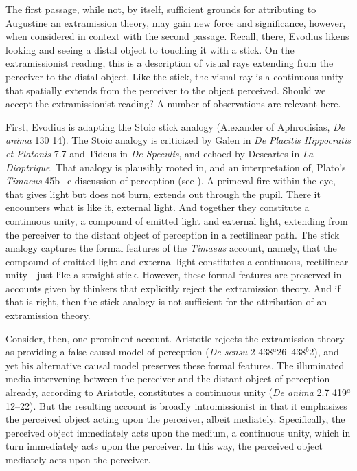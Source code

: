 \documentclass[12pt]{article}
\begin{document}
The first passage, while not, by itself, sufficient grounds for attributing to Augustine an extramission theory, may gain new force and significance, however, when considered in context with the second passage. Recall, there, Evodius likens looking and seeing a distal object to touching it with a stick. On the extramissionist reading, this is a description of visual rays extending from the perceiver to the distal object. Like the stick, the visual ray is a continuous unity that spatially extends from the perceiver to the object perceived. Should we accept the extramissionist reading? A number of observations are relevant here.

First, Evodius is adapting the Stoic stick analogy (Alexander of Aphrodisias, \emph{De anima} 130 14).  The Stoic analogy is criticized by Galen in \emph{De Placitis Hippocratis et Platonis} 7.7 and Tideus in \emph{De Speculis}, and echoed by Descartes in \emph{La Dioptrique}. That analogy is plausibly rooted in, and an interpretation of, Plato's \emph{Timaeus} 45b−c discussion of perception (see \citealt[chapter one]{Lindberg:1977aa}). A primeval fire within the eye, that gives light but does not burn, extends out through the pupil. There it encounters what is like it, external light. And together they constitute a continuous unity, a compound of emitted light and external light, extending from the perceiver to the distant object of perception in a rectilinear path. The stick analogy captures the formal features of the \emph{Timaeus} account, namely, that the compound of emitted light and external light constitutes a continuous, rectilinear unity---just like a straight stick. However, these formal features are preserved in accounts given by thinkers that explicitly reject the extramission theory. And if that is right, then the stick analogy is not sufficient for the attribution of an extramission theory. 

Consider, then, one prominent account. Aristotle rejects the extramission theory as providing a false causal model of perception (\emph{De sensu} 2 438\( ^{a} \)26--438\( ^{b} \)2), and yet his alternative causal model preserves these formal features. The illuminated media intervening between the perceiver and the distant object of perception already, according to Aristotle, constitutes a continuous unity (\emph{De anima} 2.7 419\( ^{a} \)12--22). But the resulting account is broadly intromissionist in that it emphasizes the perceived object acting upon the perceiver, albeit mediately. Specifically, the perceived object immediately acts upon the medium, a continuous unity, which in turn immediately acts upon the perceiver. In this way, the perceived object mediately acts upon the perceiver. 
\end{document}
